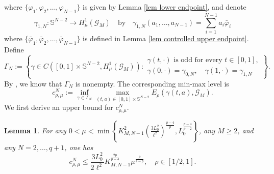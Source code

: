 \documentclass[11pt]{amsart}
\newtheorem{lemma}[theorem]{Lemma}
\newcommand{\G}{\mathcal{G}}
\numberwithin{equation}{section}
\begin{document}
where $\{\varphi_{1},\varphi_{2},\ldots,\varphi_{N-1}\}$ is given by Lemma \ref{lem lower endpoint}, and denote
$$
\gamma_{1,N}:\mathbb S^{N-2}\to H^1_\mu(\G_M)\quad\text{by}\quad \gamma_{1,N} (a_{1}, \ldots,a_{N-1})=\sum_{i=1}^{N-1}a_{i}\bar{\varphi}_{i}
$$
where $\{\bar{\varphi}_{1},\bar{\varphi}_{2},\ldots,\bar{\varphi}_{N-1}\}$ is defined in Lemma \ref{lem controlled upper endpoint}. Define
\begin{equation*}
\Gamma_N:=\left\{\gamma\in C([0,1]\times{\mathbb S}^{N-2},H^1_\mu(\G_M)):\begin{array}{l}
\gamma(t,\cdot)\text{ is odd for every }t\in[0,1],\\
\gamma(0,\cdot)=\gamma_{0,N},\quad \gamma(1,\cdot)=\gamma_{1,N}
\end{array}\right\}.
\end{equation*}
By \cite[Lemma 2.8]{Ca}, we know that $\Gamma_N$ is nonempty. 
The corresponding min-max level is
\begin{equation*}
c_{\rho,\mu}^N:=\inf_{\gamma\in\Gamma_N}\max_{(t,a)\in[0,1]\times{\mathbb S}^{N-2}}E_\rho(\gamma(t,a),\G_M).
\end{equation*}
We first derive an upper bound for $c_{\rho,\mu}^N$.
\begin{lemma}\label{lem upper bound cN}
For any $0<\mu<\min\left\{K_{M,N-1}^2
\left(\frac{3L_0^2}{\ell^2}\right)^{\frac{p-4}{p}},L_0^\frac{p-4}{p-2}\right\}$, any $M\geq 2$, and any
$N=2,\ldots,q+1$, one has
$$
c_{\rho,\mu}^N
\leq
\frac{3L_0^2}{2\ell^2}K^{\frac{2p}{p-4}}_{M,N-1}
\mu^\frac{p}{4-p}, \quad \rho\in [1/2,1].
$$
\end{lemma}
\end{document}
